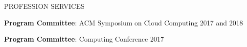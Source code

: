 \documentclass{resume} %
\begin{document}
\begin{rSection}{PROFESSION SERVICES}

\hspace{-1em} \textbf{Program Committee}: ACM Symposium on Cloud Computing \hfill {2017 and 2018}


\vspace{-.1in}
\hspace{-1em} \textbf{Program Committee}: Computing Conference \hfill {2017}

\end{rSection}
\vspace{-.05in}





\end{document}
